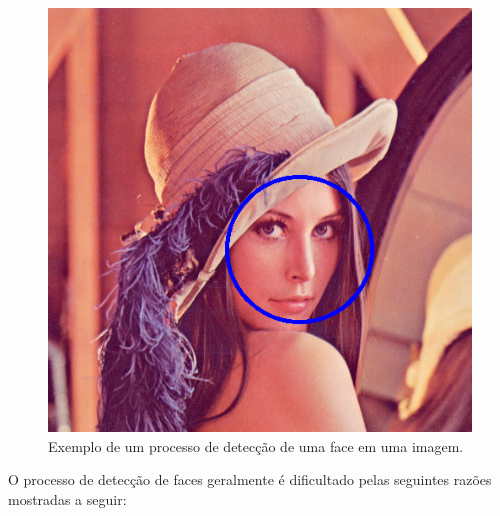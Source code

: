 	\begin{figure}[hbt]
		\begin{center}
			\includegraphics[width=14cm]{figuras/2.FundamentacaoTeorica/enquadramentoRosto.png}
		\end{center}
		\caption{Exemplo de um processo de detecção de uma face em uma imagem.}
		\label{enquadramentoRosto}
	\end{figure}

O processo de detecção de faces geralmente é dificultado pelas seguintes razões mostradas a seguir:

